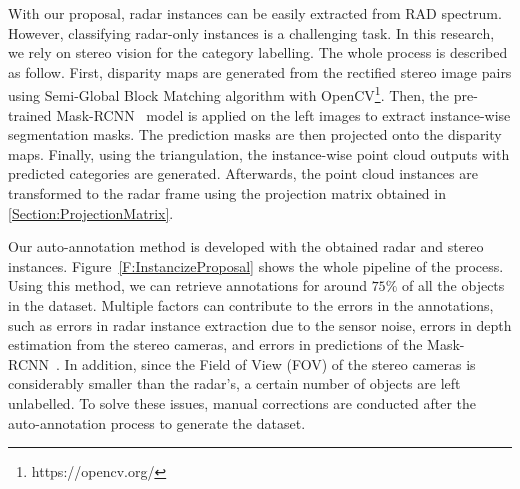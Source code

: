 \documentclass[10pt, conference, compsocconf]{IEEEtran}
\begin{document}
With our proposal, radar instances can be easily extracted from RAD spectrum. 
However, classifying radar-only instances is a challenging task. In this research, we rely on stereo vision 
for the category labelling. The whole process is described as follow. 
First, disparity maps are generated from the rectified stereo image pairs using Semi-Global Block Matching algorithm with OpenCV\footnote{https://opencv.org/}. 
Then, the pre-trained Mask-RCNN~\cite{Ref:MRCNN} model is applied on the left images to extract instance-wise segmentation masks. The prediction masks are then projected onto the disparity maps. Finally, using the triangulation, the instance-wise point cloud outputs with predicted categories are generated. Afterwards, the point cloud instances are transformed to the radar frame using the projection matrix obtained in \ref{Section:ProjectionMatrix}.

Our auto-annotation method is developed with the obtained radar and stereo instances. Figure~\ref{F:InstancizeProposal} shows the whole pipeline of the process. 
Using this method, we can retrieve annotations for around $75\%$ of all the objects in the dataset. 
Multiple factors can contribute to the errors in the annotations, such as errors in radar instance extraction due to the sensor noise, errors in depth estimation from the stereo cameras, and errors in predictions of the Mask-RCNN~\cite{Ref:MRCNN}.  
In addition, since the Field of View (FOV) of the stereo cameras is considerably smaller than the radar's, a certain number of objects are left unlabelled. To solve these issues, manual corrections are conducted 
after the auto-annotation process to generate the dataset. 
\end{document}

